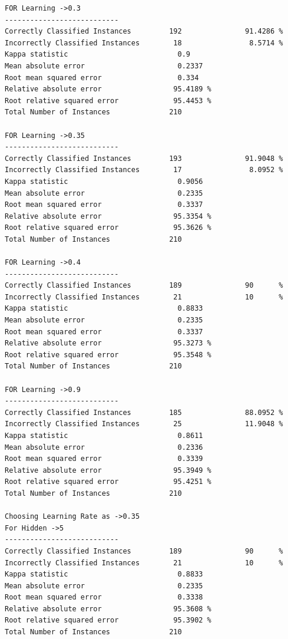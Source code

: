 \documentclass[fontsize=10pt,DIV=14]{scrartcl}
\begin{document}
\begin{itemize}
\begin{verbatim}
FOR Learning ->0.3 
---------------------------
Correctly Classified Instances         192               91.4286 %
Incorrectly Classified Instances        18                8.5714 %
Kappa statistic                          0.9   
Mean absolute error                      0.2337
Root mean squared error                  0.334 
Relative absolute error                 95.4189 %
Root relative squared error             95.4453 %
Total Number of Instances              210     

FOR Learning ->0.35 
---------------------------
Correctly Classified Instances         193               91.9048 %
Incorrectly Classified Instances        17                8.0952 %
Kappa statistic                          0.9056
Mean absolute error                      0.2335
Root mean squared error                  0.3337
Relative absolute error                 95.3354 %
Root relative squared error             95.3626 %
Total Number of Instances              210     

FOR Learning ->0.4 
---------------------------
Correctly Classified Instances         189               90      %
Incorrectly Classified Instances        21               10      %
Kappa statistic                          0.8833
Mean absolute error                      0.2335
Root mean squared error                  0.3337
Relative absolute error                 95.3273 %
Root relative squared error             95.3548 %
Total Number of Instances              210     

FOR Learning ->0.9 
---------------------------
Correctly Classified Instances         185               88.0952 %
Incorrectly Classified Instances        25               11.9048 %
Kappa statistic                          0.8611
Mean absolute error                      0.2336
Root mean squared error                  0.3339
Relative absolute error                 95.3949 %
Root relative squared error             95.4251 %
Total Number of Instances              210     

Choosing Learning Rate as ->0.35
For Hidden ->5 
---------------------------
Correctly Classified Instances         189               90      %
Incorrectly Classified Instances        21               10      %
Kappa statistic                          0.8833
Mean absolute error                      0.2335
Root mean squared error                  0.3338
Relative absolute error                 95.3608 %
Root relative squared error             95.3902 %
Total Number of Instances              210     


\end{verbatim}
\end{itemize}
\end{document}
